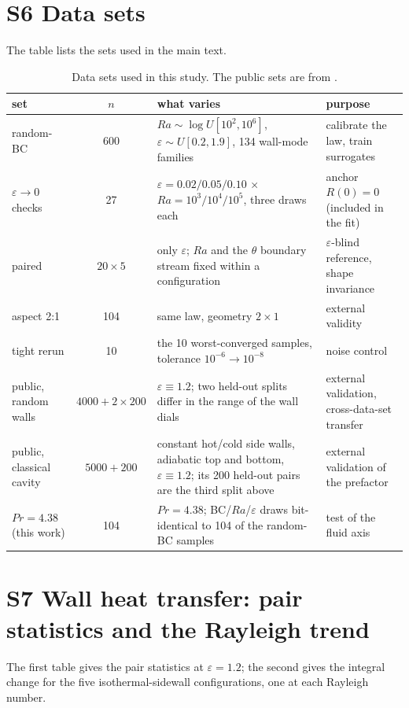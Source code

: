 \documentclass[preprint,11pt,a4paper,times,doubleblind]{elsarticle}
\begin{document}
\section*{S6 Data sets}
The table lists the sets used in the main text.
\begin{table}[htbp]
\centering
\footnotesize
\setlength{\tabcolsep}{4pt}
\caption{Data sets used in this study. The public sets are from
\citet{menglik2026neural}.}
\label{tab:data}
\begin{tabular}{@{}p{3.0cm}c p{4.0cm}p{2.8cm}@{}}
\toprule
set & $n$ & what varies & purpose\\
\midrule
random-BC & 600 & $Ra\sim\log U[10^2,10^6]$, $\varepsilon\sim U[0.2,1.9]$, 134 wall-mode
families & calibrate the law, train surrogates\\
$\varepsilon\to0$ checks & 27 & $\varepsilon=0.02/0.05/0.10$ $\times$ $Ra=10^3/10^4/10^5$, three draws each &
anchor $R(0)=0$ (included in the fit)\\
paired & $20\times5$ & only $\varepsilon$; $Ra$ and the $\theta$ boundary stream fixed within a
configuration & $\varepsilon$-blind reference, shape invariance\\
aspect 2:1 & 104 & same law, geometry $2\times1$ & external validity\\
tight rerun & 10 & the 10 worst-converged samples, tolerance $10^{-6}\to10^{-8}$ & noise control\\
public, random walls \citep{menglik2026neural} & $4000+2\times200$ & $\varepsilon\equiv1.2$; two
held-out splits differ in the range of the wall dials & external
validation, cross-data-set transfer\\
public, classical cavity \citep{menglik2026neural} & $5000+200$ & constant hot/cold side walls,
adiabatic top and bottom, $\varepsilon\equiv1.2$; its 200 held-out pairs are the third split above
& external validation of the prefactor\\
$Pr=4.38$ (this work) & 104 & $Pr=4.38$; BC/$Ra$/$\varepsilon$ draws bit-identical to 104 of the
random-BC samples & test of the fluid axis\\
\bottomrule
\end{tabular}
\end{table}

\section*{S7 Wall heat transfer: pair statistics and the Rayleigh trend}
The first table gives the pair statistics at $\varepsilon=1.2$; the second gives the integral
change for the five isothermal-sidewall configurations, one at each Rayleigh number.
\end{document}
